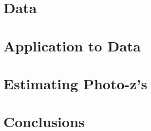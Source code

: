 \documentclass[twocolumn]{aastex63}
\begin{document}
\section{Data}
    
    
\section{Application to Data}
      
    
\section{Estimating Photo-z's}
    

\section{Conclusions}

\acknowledgments
    
    
{}

\end{document}
